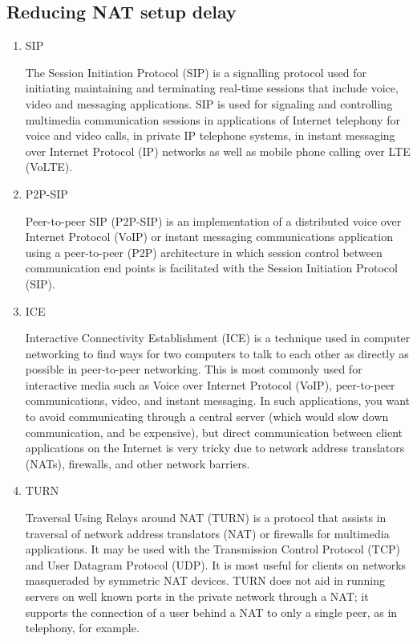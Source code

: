 \documentclass[twocolumn]{preport}
\begin{document}
\subsection{Reducing NAT setup delay}
\begin{enumerate}
 \item SIP\par
   The Session Initiation Protocol (SIP) is a signalling protocol used for initiating maintaining and terminating real-time sessions that include voice, video and messaging applications. SIP is used for signaling and controlling multimedia communication sessions in applications of Internet telephony for voice and video calls, in private IP telephone systems, in instant messaging over Internet Protocol (IP) networks as well as mobile phone calling over LTE (VoLTE).
 \item P2P-SIP\par
   Peer-to-peer SIP (P2P-SIP) is an implementation of a distributed voice over Internet Protocol (VoIP) or instant messaging communications application using a peer-to-peer (P2P) architecture in which session control between communication end points is facilitated with the Session Initiation Protocol (SIP).
 \item ICE\par
   Interactive Connectivity Establishment (ICE) is a technique used in computer networking to find ways for two computers to talk to each other as directly as possible in peer-to-peer networking. This is most commonly used for interactive media such as Voice over Internet Protocol (VoIP), peer-to-peer communications, video, and instant messaging. In such applications, you want to avoid communicating through a central server (which would slow down communication, and be expensive), but direct communication between client applications on the Internet is very tricky due to network address translators (NATs), firewalls, and other network barriers.
 \item TURN\par
   Traversal Using Relays around NAT (TURN) is a protocol that assists in traversal of network address translators (NAT) or firewalls for multimedia applications. It may be used with the Transmission Control Protocol (TCP) and User Datagram Protocol (UDP). It is most useful for clients on networks masqueraded by symmetric NAT devices. TURN does not aid in running servers on well known ports in the private network through a NAT; it supports the connection of a user behind a NAT to only a single peer, as in telephony, for example.
\end{enumerate}
\end{document}
